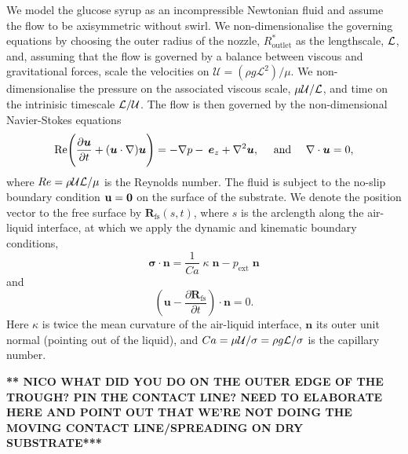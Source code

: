 \documentclass[aip,graphicx]{revtex4-1}
\newcommand{\sym}[1]{\text{#1}} \newcommand{\dif}{\mathrm{d}}
\newcommand{\vect}[1]{\bm{#1}}
\begin{document}
We model the glucose syrup as an incompressible Newtonian fluid
and assume the flow to be axisymmetric without swirl. 
We non-dimensionalise the governing equations by choosing 
the outer radius of the nozzle, $R_{\sym{outlet}}^*$ as the
lengthscale, ${\cal L}$, and, assuming that the flow is governed by a 
balance between viscous and gravitational forces, scale the velocities on
$\mathcal{U}=(\rho g \mathcal{L}^2) / \mu$. We non-dimensionalise the 
pressure on the associated viscous scale, $\mu {\cal U}/{\cal L}$,
and time on the intrinisic timescale ${\cal L}/{\cal U}$.
The flow is then governed by the non-dimensional Navier-Stokes equations
\begin{equation}
 \sym{Re} \Bigg( \pder[\vect{u}]{t} + (\vect{u} \cdot \nabla)
 \vect{u} \Bigg) = - \nabla p - \: \vect{e}_z
 + \nabla^2 \vect{u},
\mbox{ \ \ \ and \ \  \ }
 \nabla \cdot \vect{u} = 0,
 \label{eqn:ns}
\end{equation}
where $Re=\rho {\cal U} {\cal L}/\mu$ is the Reynolds number.
The fluid is subject to the no-slip boundary condition ${\bf u} = {\bf 0}$
on the surface of the substrate. We denote the position vector
to the free surface by $\vect{R}_{\sym{fs}}(s,t)$, where $s$ is
the arclength along the air-liquid interface, at which we
apply the dynamic and kinematic boundary conditions,
\begin{equation}
\vect{\sigma} \cdot \vect{n} = \frac{1}{Ca} \; \kappa \; \vect{n}
-p_{\sym{ext}} \; \vect{n}
\end{equation}
and
\begin{equation}
\left( \vect{u} - \frac{\partial \vect{R}_{\sym{fs}}}{\partial t} \right)
\cdot \vect{n} = 0.
\end{equation}
Here $\kappa$ is twice the mean curvature of the air-liquid interface, 
$\vect{n}$ its outer unit normal (pointing out of the liquid), 
and $Ca=\mu {\cal U}/\sigma=\rho g {\cal L}/\sigma$ is the capillary
number. 

{\bf *** NICO WHAT DID YOU DO ON THE OUTER EDGE OF THE TROUGH?
PIN THE CONTACT LINE? NEED TO ELABORATE HERE AND POINT OUT THAT
WE'RE NOT DOING THE MOVING CONTACT LINE/SPREADING ON DRY SUBSTRATE***}
\end{document}
